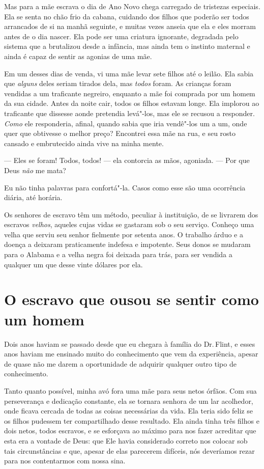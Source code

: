 Mas para a mãe escrava o dia de Ano
Novo chega carregado de tristezas especiais. Ela se senta no chão frio
da cabana, cuidando dos filhos que poderão ser todos arrancados de si na
manhã seguinte, e muitas vezes anseia que ela e eles morram antes de o
dia nascer. Ela pode ser uma criatura ignorante, degradada pelo sistema
que a brutalizou desde a infância, mas ainda tem o instinto maternal e
ainda é capaz de sentir as agonias de uma mãe.

Em um desses dias de venda, vi uma mãe
levar sete filhos até o leilão. Ela sabia que \emph{alguns} deles seriam
tirados dela, mas \emph{todos} foram. As crianças foram vendidas a um
traficante negreiro, enquanto a mãe foi comprada por um homem da sua
cidade. Antes da noite cair, todos os filhos estavam longe. Ela implorou
ao traficante que dissesse aonde pretendia levá"-los, mas ele se recusou
a responder. \emph{Como} ele responderia, afinal, quando sabia que iria
vendê"-los um a um, onde quer que obtivesse o melhor preço? Encontrei
essa mãe na rua, e seu rosto cansado e embrutecido ainda vive na minha
mente.

--- Eles se foram! Todos, todos! --- ela contorcia as mãos, agoniada.
--- Por que Deus \emph{não} me mata?

Eu não tinha palavras para confortá"-la. Casos como esse são uma
ocorrência diária, até horária.

Os senhores de escravo têm um método,
peculiar à instituição, de se livrarem dos escravos \emph{velhos},
aqueles cujas vidas se gastaram sob o seu serviço. Conheço uma velha que
serviu seu senhor fielmente por setenta anos. O trabalho árduo e a
doença a deixaram praticamente indefesa e impotente. Seus donos se
mudaram para o Alabama e a velha negra foi deixada para trás, para ser
vendida a qualquer um que desse vinte dólares por ela.

\chapter*{O escravo que ousou se sentir como um homem}

Dois anos haviam se passado desde que
eu chegara à família do Dr.\,Flint, e esses anos haviam me ensinado muito
do conhecimento que vem da experiência, apesar de quase não me darem a
oportunidade de adquirir qualquer outro tipo de conhecimento.

Tanto quanto possível, minha avó fora
uma mãe para seus netos órfãos. Com sua perseverança e dedicação
constante, ela se tornara senhora de um lar acolhedor, onde ficava
cercada de todas as coisas necessárias da vida. Ela teria sido feliz se
os filhos pudessem ter compartilhado desse resultado. Ela ainda tinha
três filhos e dois netos, todos escravos, e se esforçava ao máximo para
nos fazer acreditar que esta era a vontade de Deus: que Ele havia
considerado correto nos colocar sob tais circunstâncias e que, apesar de
elas parecerem difíceis, nós deveríamos rezar para nos contentarmos com
nossa sina.

